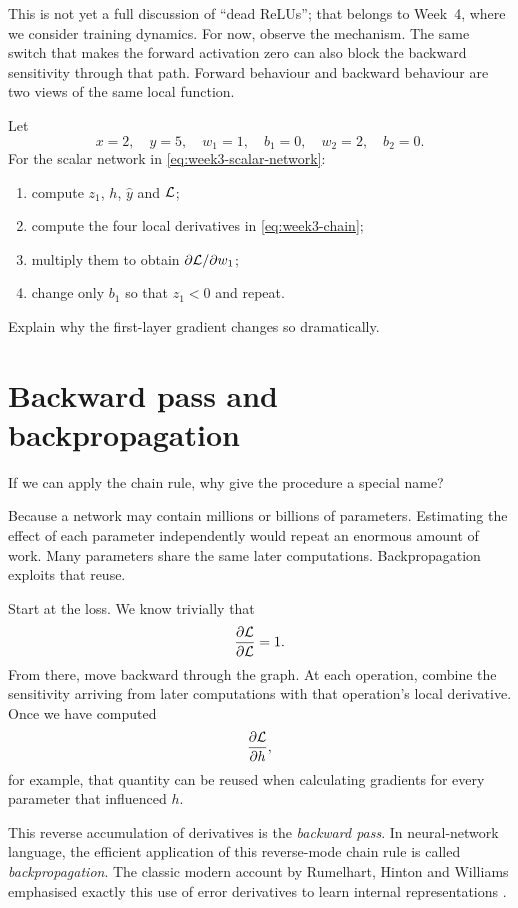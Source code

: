 This is not yet a full discussion of ``dead ReLUs''; that belongs to Week~4, where we consider training dynamics. For now, observe the mechanism. The same switch that makes the forward activation zero can also block the backward sensitivity through that path. Forward behaviour and backward behaviour are two views of the same local function.

\begin{optionalexercise}[title={Optional mathematics --- follow one gradient}]
Let
\[
x=2,\quad y=5,\quad w_1=1,\quad b_1=0,\quad w_2=2,\quad b_2=0.
\]
For the scalar network in \cref{eq:week3-scalar-network}:
\begin{enumerate}[leftmargin=*]
  \item compute \(z_1\), \(h\), \(\hat y\) and \(\mathcal{L}\);
  \item compute the four local derivatives in \cref{eq:week3-chain};
  \item multiply them to obtain \(\partial\mathcal{L}/\partial w_1\);
  \item change only \(b_1\) so that \(z_1<0\) and repeat.
\end{enumerate}
Explain why the first-layer gradient changes so dramatically.
\end{optionalexercise}

\section{Backward pass and backpropagation}

If we can apply the chain rule, why give the procedure a special name?

Because a network may contain millions or billions of parameters. Estimating the effect of each parameter independently would repeat an enormous amount of work. Many parameters share the same later computations. Backpropagation exploits that reuse.

Start at the loss. We know trivially that
\[
  \frac{\partial\mathcal{L}}{\partial\mathcal{L}}=1.
\]
From there, move backward through the graph. At each operation, combine the sensitivity arriving from later computations with that operation's local derivative. Once we have computed
\[
  \frac{\partial\mathcal{L}}{\partial h},
\]
for example, that quantity can be reused when calculating gradients for every parameter that influenced \(h\).

This reverse accumulation of derivatives is the \emph{backward pass}. In neural-network language, the efficient application of this reverse-mode chain rule is called \emph{backpropagation}. The classic modern account by Rumelhart, Hinton and Williams emphasised exactly this use of error derivatives to learn internal representations \parencite{rumelhart1986}.

